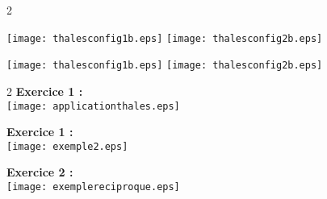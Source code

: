 \documentclass[a4paper,10pt,twoside,french]{article}
\newcommand{\bmul}[1]{\begin{multicols}{#1}}
\newcommand{\emul}{\end{multicols}}
\begin{document}
\bmul{2}
\begin{center}
 \texttt{[image: thalesconfig1b.eps]} \texttt{[image: thalesconfig2b.eps]} 
\end{center}

\columnbreak

\begin{center}
 \texttt{[image: thalesconfig1b.eps]} \texttt{[image: thalesconfig2b.eps]} 
\end{center}

\emul


\bmul{2}
\textbf{Exercice 1 : }\\
\texttt{[image: applicationthales.eps]} 

\columnbreak

\textbf{Exercice 1 : }\\
\texttt{[image: exemple2.eps]} 

\emul



 
\textbf{Exercice 2 : }\\
\texttt{[image: exemplereciproque.eps]} 
\end{document}
